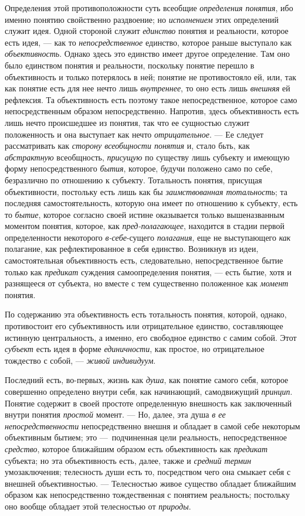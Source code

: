 \documentclass[twoside]{article}
\begin{document}
{{{Определения этой противоположности суть всеобщие
{\em определения понятия},
ибо именно понятию свойственно раздвоение; но
{\em исполнением} этих
определений служит идея. Одной стороной служит
{\em единство} понятия и
реальности, которое есть идея, — как то
{\em непосредственное}
единство, которое раньше выступало как
{\em объективность}.
Однако здесь это единство имеет другое определение. Там оно
было единством понятия и реальности, поскольку понятие перешло в
объективность и только потерялось в ней; понятие не противостояло ей, или,
так как понятие есть для нее нечто лишь
{\em внутреннее}, то оно
есть лишь {\em внешняя}
ей рефлексия. Та объективность есть поэтому такое
непосредственное, которое само непосредственным образом непосредственно.
Напротив, здесь объективность есть лишь нечто происшедшее из понятия, так
что ее сущностью служит положенность и она выступает как нечто
{\em отрицательное}. — Ее
следует рассматривать как {\em сторону
всеобщности понятия} и, стало бьть, как
{\em абстрактную}
всеобщность,
{\em присущую} по
существу лишь субъекту и имеющую форму непосредственного
{\em бытия}, которое,
будучи положено само по себе, безразлично по отношению к субъекту.
Тотальность понятия, присущая объективности, постольку есть лишь как бы
{\em заимствованная тотальность};
та последняя самостоятельность, которую она
имеет по отношению к субъекту, есть то
{\em бытие}, которое
согласно своей истине оказывается только вышеназванным моментом понятия,
которое, как {\em пред-полагающее},
находится в стадии первой определенности некоторого
{\em в-себе}{}-сущего
{\em полагания}, еще не
выступающего {\em как}
полагание, как рефлектированное в себя единство. Возникнув
из идеи, самостоятельная объективность есть, следовательно,
непосредственное бытие только как
{\em предикат} суждения
самоопределения понятия, — есть бытие, хотя и разнящееся от
субъекта, но вместе с тем существенно положенное как
{\em момент} понятия.

По содержанию эта объективность есть тотальность понятия,
которой, однако, противостоит его субъективность или отрицательное
единство, составляющее истинную центральность, а именно, его свободное
единство с самим собой. Этот
{\em субъект} есть идея в
форме {\em единичности},
как простое, но отрицательное тождество с собой, —
{\em живой индивидуум}.

Последний есть, во-первых, жизнь как
{\em душа}, как понятие
самого себя, которое совершенно определено внутри себя, как начинающий,
самодвижущий {\em принцип}.
Понятие содержит в своей простоте определенную внешность как
заключенный внутри понятия
{\em простой} момент. —
Но, далее, эта душа {\em в
ее непосредственности} непосредственно внешня и обладает в
самой себе некоторым объективным бытием; это —~подчиненная
цели реальность, непосредственное
{\em средство}, которое
ближайшим образом есть объективность как
{\em предикат} субъекта;
но эта объективность есть, далее, также и
{\em средний термин}
умозаключения; телесность души есть то, посредством чего она
смыкает себя с внешней объективностью. — Телесностью живое
существо обладает ближайшим образом как непосредственно тождественная с
понятием реальность; постольку оно вообще обладает этой телесностью от
{\em природы}.

}}}
\end{document}
